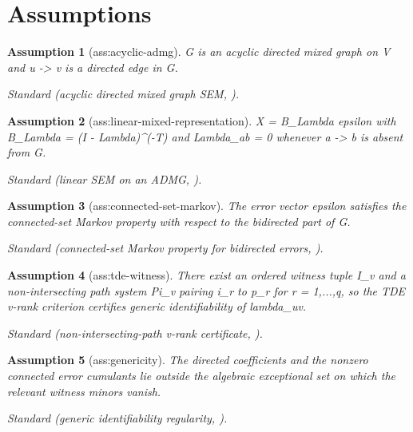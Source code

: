 \documentclass{article}
\newtheorem{assumption}{Assumption}
\begin{document}
\section{Assumptions}

\begin{assumption}[ass:acyclic-admg]\label{ass:acyclic-admg}
G is an acyclic directed mixed graph on V and u -> v is a directed edge in G.
\par\smallskip\noindent\emph{Standard} (acyclic directed mixed graph SEM, \cite{TramontanoDrtonEtesami2024}).
\end{assumption}

\begin{assumption}[ass:linear-mixed-representation]\label{ass:linear-mixed-representation}
X = B_Lambda epsilon with B_Lambda = (I - Lambda)^(-T) and Lambda_ab = 0 whenever a -> b is absent from G.
\par\smallskip\noindent\emph{Standard} (linear SEM on an ADMG, \cite{TramontanoDrtonEtesami2024}).
\end{assumption}

\begin{assumption}[ass:connected-set-markov]\label{ass:connected-set-markov}
The error vector epsilon satisfies the connected-set Markov property with respect to the bidirected part of G.
\par\smallskip\noindent\emph{Standard} (connected-set Markov property for bidirected errors, \cite{TramontanoDrtonEtesami2024}).
\end{assumption}

\begin{assumption}[ass:tde-witness]\label{ass:tde-witness}
There exist an ordered witness tuple I_v and a non-intersecting path system Pi_v pairing i_r to p_r for r = 1,...,q, so the TDE v-rank criterion certifies generic identifiability of lambda_uv.
\par\smallskip\noindent\emph{Standard} (non-intersecting-path v-rank certificate, \cite{TramontanoDrtonEtesami2024}).
\end{assumption}

\begin{assumption}[ass:genericity]\label{ass:genericity}
The directed coefficients and the nonzero connected error cumulants lie outside the algebraic exceptional set on which the relevant witness minors vanish.
\par\smallskip\noindent\emph{Standard} (generic identifiability regularity, \cite{TramontanoDrtonEtesami2024}).
\end{assumption}
\end{document}
